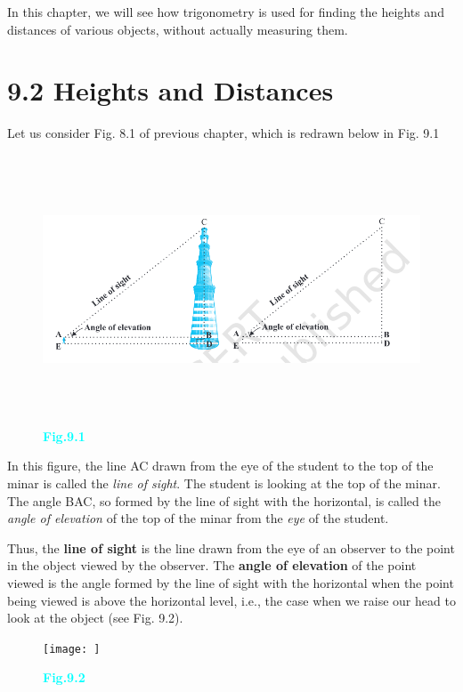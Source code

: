\documentclass[12pt]{article}
\begin{document}
\hspace{2em}
In this chapter, we will see how trigonometry is used for finding the heights and distances of various objects, without actually measuring them.
\vspace{-2em}
\section*{9.2 Heights and Distances}
\vspace{-1em}
Let us consider Fig. 8.1 of previous chapter, which is redrawn below in Fig. 9.1
\begin{center}
\begin{figure}[h]
\includegraphics[width=17cm,height=8cm]{math.png}
\caption*{\textbf{\textcolor{cyan}{Fig.9.1}}}
\end{figure}
\end{center}
\vspace{-3em}
\hspace{2em}In this figure, the line AC drawn from the eye of the student to the top of the minar is called the \textit{line of sight}. The student is looking at the top of the minar. The angle BAC, so formed by the line of sight with the horizontal, is called the \textit{angle of elevation} of the top of the minar from the \textit{eye} of the student.

\hspace{2em}Thus, the \textbf{line of sight} is the line drawn from the eye of an observer to the point in the object viewed by the observer. The \textbf{angle of elevation} of the point viewed is the angle formed by the line of sight with the horizontal when the point being viewed is above the horizontal level, i.e., the case when we raise our head to look at the object (see Fig. 9.2).
\vspace{5em}\begin{center}\begin{figure}[h]
\texttt{[image: ]}
\caption*{\textbf{\textcolor{cyan}{Fig.9.2}}}
\end{figure}
\end{center}

\end{document}
